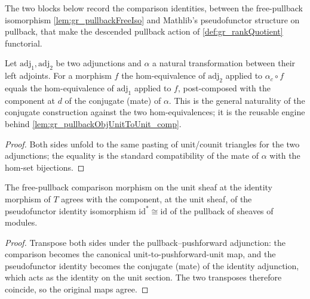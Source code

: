 The two blocks below record the comparison identities, between the free-pullback isomorphism
\cref{lem:gr_pullbackFreeIso} and Mathlib's pseudofunctor structure on pullback, that make
the descended pullback action of \cref{def:gr_rankQuotient} functorial.


\begin{lemma}
  \label{lem:gr_homEquiv_conjugateEquiv_app}
  Let \(\mathrm{adj}_1, \mathrm{adj}_2\) be two adjunctions and \(\alpha\) a natural
  transformation between their left adjoints. For a morphism \(f\) the hom-equivalence of
  \(\mathrm{adj}_2\) applied to \(\alpha_c \circ f\) equals the hom-equivalence of
  \(\mathrm{adj}_1\) applied to \(f\), post-composed with the component at \(d\) of the
  conjugate (mate) of \(\alpha\). This is the general naturality of the conjugate
  construction against the two hom-equivalences; it is the reusable engine behind
  \cref{lem:gr_pullbackObjUnitToUnit_comp}.
\end{lemma}

\begin{proof}


\leanok
  Both sides unfold to the same pasting of unit/counit triangles for the two adjunctions;
  the equality is the standard compatibility of the mate of \(\alpha\) with the
  hom-set bijections.
\end{proof}

\begin{lemma}
  \label{lem:gr_pullbackObjUnitToUnit_id}
  The free-pullback comparison morphism on the unit sheaf at the identity morphism of \(T\)
  agrees with the component, at the unit sheaf, of the pseudofunctor identity isomorphism
  \(\mathrm{id}^{*} \cong \mathrm{id}\) of the pullback of sheaves of modules.
\end{lemma}
\begin{proof}

\leanok
  Transpose both sides under the pullback--pushforward adjunction: the comparison becomes the
  canonical unit-to-pushforward-unit map, and the pseudofunctor identity becomes the conjugate
  (mate) of the identity adjunction, which acts as the identity on the unit section. The two
  transposes therefore coincide, so the original maps agree.
\end{proof}

